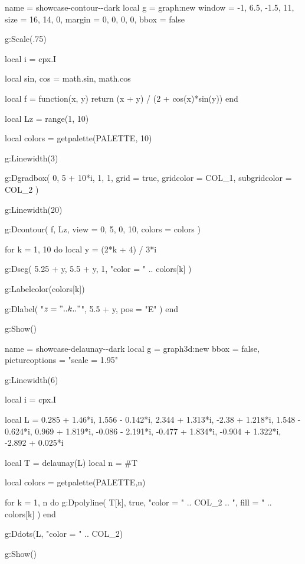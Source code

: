 
\newpage

\begin{luadraw}{name = showcase-contour-\PALETTE-dark}
local g = graph:new{
  window = {-1, 6.5, -1.5, 11},
  size   = {16, 14, 0},
  margin = {0, 0, 0, 0},
  bbox   = false
}

g:Scale(.75)

local i = cpx.I

local sin, cos = math.sin, math.cos

local f = function(x, y)
  return (x + y) / (2 + cos(x)*sin(y))
end

local Lz = range(1, 10)

local colors = getpalette(PALETTE, 10)

g:Linewidth(3)

g:Dgradbox(
  {0, 5 + 10*i, 1, 1},
  {
    grid         = true,
    gridcolor    = COL_1,
    subgridcolor = COL_2
  }
)

g:Linewidth(20)

g:Dcontour(
  f,
  Lz,
  {
    view   = {0, 5, 0, 10},
    colors = colors
  }
)

for k = 1, 10 do
  local y = (2*k + 4) / 3*i

  g:Dseg(
    {5.25 + y, 5.5 + y},
    1,
    "color = " .. colors[k]
  )

  g:Labelcolor(colors[k])

  g:Dlabel(
    "$z = " .. k .. "$",
    5.5 + y,
    {pos = "E"}
  )
end

g:Show()
\end{luadraw}



\vfill

\begin{luadraw}{name = showcase-delaunay-\PALETTE-dark}
local g = graph3d:new{
  bbox           = false,
  pictureoptions = "scale = 1.95"
}

g:Linewidth(6)

local i = cpx.I

local L = {
   0.285 + 1.46*i,
   1.556 - 0.142*i,
   2.344 + 1.313*i,
  -2.38  + 1.218*i,
   1.548 - 0.624*i,
   0.969 + 1.819*i,
  -0.086 - 2.191*i,
  -0.477 + 1.834*i,
  -0.904 + 1.322*i,
  -2.892 + 0.025*i
}

local T = delaunay(L)
local n = #T

local colors = getpalette(PALETTE,n)

for k = 1, n do
  g:Dpolyline(
    T[k],
    true,
       "color = " .. COL_2
    .. ", fill = " .. colors[k]
  )
end

g:Ddots(L, "color = " .. COL_2)

g:Show()
\end{luadraw}


